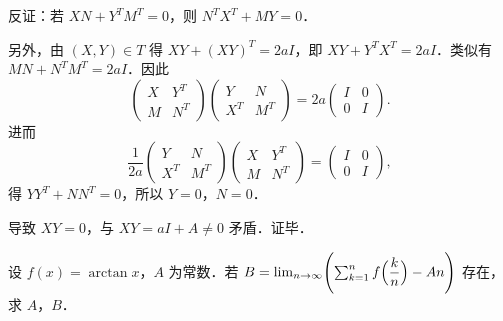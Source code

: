\begin{solution}
反证：若 $XN+Y^TM^T=0$，则 $N^TX^T+MY=0$．

另外，由 $(X,Y)\in T$ 得 $XY+(XY)^T=2aI$，即 $XY+Y^TX^T=2aI$．类似有 $MN+N^TM^T=2aI$．因此
\[
  \begin{pmatrix}X&Y^T\\ M&N^T\end{pmatrix}
  \begin{pmatrix}Y&N\\ X^T&M^T\end{pmatrix}
  =2a\begin{pmatrix}I&0\\ 0&I\end{pmatrix}.
\]
进而
\[
  \frac{1}{2a}\begin{pmatrix}Y&N\\ X^T&M^T\end{pmatrix}
  \begin{pmatrix}X&Y^T\\ M&N^T\end{pmatrix}
  =\begin{pmatrix}I&0\\ 0&I\end{pmatrix},
\]
得 $YY^T+NN^T=0$，所以 $Y=0$，$N=0$．

导致 $XY=0$，与 $XY=aI+A\ne 0$ 矛盾．证毕．
\end{solution}

设 $f(x)=\arctan x$，$A$ 为常数．若 $B=\lim_{n\to\infty}\Biggl(\sum_{k=1}^{n}f\Bigl(\dfrac{k}{n}\Bigr)-An\Biggr)$ 存在，求 $A$，$B$．

